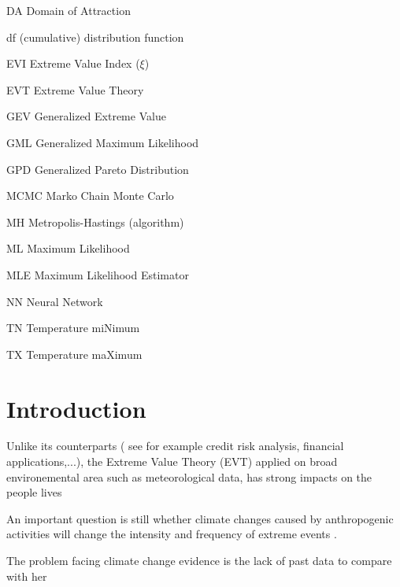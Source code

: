 \documentclass[11pt,a4paper,openany, twosided]{book}
\newcommand{\abbrlabel}[1]{\makebox[3cm][l]{\textbf{#1}\ \dotfill}}
\newenvironment{abbreviations}{\begin{list}{}{\renewcommand{\makelabel}{\abbrlabel}}}{\end{list}}
\newcommand\blankpage{%
    \null
    \thispagestyle{empty}%
    \addtocounter{page}{-1}%
    \newpage}
\begin{document}
\begin{center}
\begin{abbreviations}
	\item[DA] Domain of Attraction
	\item[df]\label{df}  (cumulative) distribution function
	\item[EVI] Extreme Value Index ($\xi$)
	\item[EVT] Extreme Value Theory
	\item[GEV] Generalized Extreme Value
	\item[GML] Generalized Maximum Likelihood
	\item[GPD] Generalized Pareto Distribution %
	\item[MCMC] Marko Chain Monte Carlo
	\item[MH] Metropolis-Hastings (algorithm)
	\item[ML] Maximum Likelihood 
	\item[MLE] Maximum Likelihood Estimator
	\item[NN] Neural Network
	\item[TN] Temperature miNimum
	\item[TX] Temperature maXimum
	
\end{abbreviations}
\end{center}


\renewcommand\labelitemi{\normalsize$\bullet$}



\afterpage{\blankpage}


\chapter*{Introduction}
\thispagestyle{empty}



Unlike its counterparts ( see for example credit risk analysis, financial applications,...), the Extreme Value Theory (EVT) applied on broad environemental area such as meteorological data, has strong impacts on the people lives 

An important question is still whether climate changes caused by anthropogenic activities will change the intensity and frequency of extreme events \cite{milly_climate_2008}.

The problem facing climate change evidence is the lack of past data to compare with her
\end{document}
